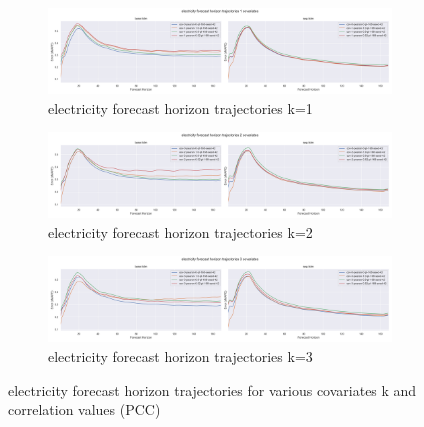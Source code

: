 \documentclass[letterpaper]{article}
\begin{document}
\begin{figure}[tbp]

\begin{subfigure}{\textwidth}
\centering
\includegraphics[width=\linewidth]{figures/base-lstm_seg-lstm_electricity_k_1_trajectory.png}
\caption{electricity forecast horizon trajectories k=1}
\label{fig:base-lstm_seg-lstm_electricity_k_1_trajectory}
\end{subfigure}

\begin{subfigure}{\textwidth}
\centering
\includegraphics[width=\linewidth]{figures/base-lstm_seg-lstm_electricity_k_2_trajectory.png}
\caption{electricity forecast horizon trajectories k=2}
\label{fig:base-lstm_seg-lstm_electricity_k_2_trajectory}
\end{subfigure}

\begin{subfigure}{\textwidth}
\centering
\includegraphics[width=\linewidth]{figures/base-lstm_seg-lstm_electricity_k_3_trajectory.png}
\caption{electricity forecast horizon trajectories k=3}
\label{fig:base-lstm_seg-lstm_electricity_k_3_trajectory}
\end{subfigure}
\caption{electricity forecast horizon trajectories for various covariates k and correlation values (PCC)}
\label{fig:base-lstm_seg-lstm_electricity_trajectory}
\end{figure}
\end{document}
